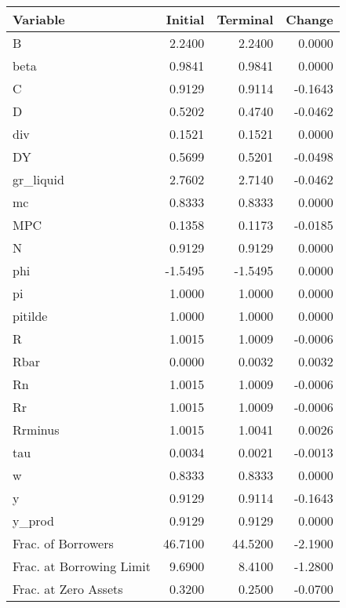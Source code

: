 \begin{table}
\centering
\label{tab:stst_comparison_low_B_wedge_permanent}
\begin{tabular}{lrrr}
\toprule
                Variable &  Initial &  Terminal &  Change \\
\midrule
                       B &   2.2400 &    2.2400 &  0.0000 \\
                    beta &   0.9841 &    0.9841 &  0.0000 \\
                       C &   0.9129 &    0.9114 & -0.1643 \\
                       D &   0.5202 &    0.4740 & -0.0462 \\
                     div &   0.1521 &    0.1521 &  0.0000 \\
                      DY &   0.5699 &    0.5201 & -0.0498 \\
               gr\_liquid &   2.7602 &    2.7140 & -0.0462 \\
                      mc &   0.8333 &    0.8333 &  0.0000 \\
                     MPC &   0.1358 &    0.1173 & -0.0185 \\
                       N &   0.9129 &    0.9129 &  0.0000 \\
                     phi &  -1.5495 &   -1.5495 &  0.0000 \\
                      pi &   1.0000 &    1.0000 &  0.0000 \\
                 pitilde &   1.0000 &    1.0000 &  0.0000 \\
                       R &   1.0015 &    1.0009 & -0.0006 \\
                    Rbar &   0.0000 &    0.0032 &  0.0032 \\
                      Rn &   1.0015 &    1.0009 & -0.0006 \\
                      Rr &   1.0015 &    1.0009 & -0.0006 \\
                 Rrminus &   1.0015 &    1.0041 &  0.0026 \\
                     tau &   0.0034 &    0.0021 & -0.0013 \\
                       w &   0.8333 &    0.8333 &  0.0000 \\
                       y &   0.9129 &    0.9114 & -0.1643 \\
                  y\_prod &   0.9129 &    0.9129 &  0.0000 \\
      Frac. of Borrowers &  46.7100 &   44.5200 & -2.1900 \\
Frac. at Borrowing Limit &   9.6900 &    8.4100 & -1.2800 \\
    Frac. at Zero Assets &   0.3200 &    0.2500 & -0.0700 \\
\bottomrule
\end{tabular}
\end{table}
